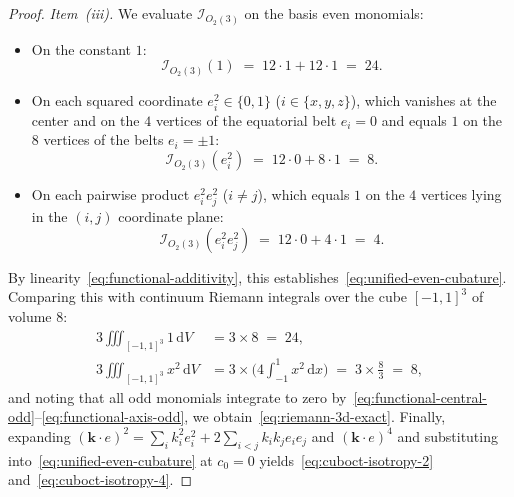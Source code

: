 \documentclass[11pt,a4paper]{article}
\theoremstyle{plain}
\theoremstyle{definition}
\begin{document}
\begin{proof}
\emph{Item~(iii).} We evaluate $\mathcal{I}_{O_2(3)}$ on the basis even monomials:
\begin{itemize}[leftmargin=*]
\item On the constant $1$:
  \begin{equation*}
    \mathcal{I}_{O_2(3)}(1) \;=\; 12\cdot 1 + 12\cdot 1 \;=\; 24.
  \end{equation*}
\item On each squared coordinate $e_i^2 \in \{0, 1\}$ ($i \in \{x, y, z\}$), which vanishes at the center and on the $4$ vertices of the equatorial belt $e_i = 0$ and equals $1$ on the $8$ vertices of the belts $e_i = \pm 1$:
  \begin{equation*}
    \mathcal{I}_{O_2(3)}(e_i^2) \;=\; 12\cdot 0 + 8\cdot 1 \;=\; 8.
  \end{equation*}
\item On each pairwise product $e_i^2 e_j^2$ ($i \ne j$), which equals $1$ on the $4$ vertices lying in the $(i, j)$ coordinate plane:
  \begin{equation*}
    \mathcal{I}_{O_2(3)}(e_i^2 e_j^2) \;=\; 12\cdot 0 + 4\cdot 1 \;=\; 4.
  \end{equation*}
\end{itemize}
By linearity~\eqref{eq:functional-additivity}, this establishes~\eqref{eq:unified-even-cubature}. Comparing this with continuum Riemann integrals over the cube $[-1, 1]^3$ of volume $8$:
\begin{align*}
  3\iiint_{[-1,1]^3} 1\,\mathrm{d}V &= 3 \times 8 \;=\; 24, \\
  3\iiint_{[-1,1]^3} x^2\,\mathrm{d}V &= 3 \times \biggl(4\int_{-1}^{1} x^2\,\mathrm{d}x\biggr) \;=\; 3 \times \frac{8}{3} \;=\; 8,
\end{align*}
and noting that all odd monomials integrate to zero by~\eqref{eq:functional-central-odd}--\eqref{eq:functional-axis-odd}, we obtain~\eqref{eq:riemann-3d-exact}. Finally, expanding $(\mathbf{k}\cdot e)^2 = \sum_i k_i^2 e_i^2 + 2\sum_{i<j} k_i k_j e_i e_j$ and $(\mathbf{k}\cdot e)^4$ and substituting into~\eqref{eq:unified-even-cubature} at $c_0 = 0$ yields~\eqref{eq:cuboct-isotropy-2} and~\eqref{eq:cuboct-isotropy-4}.
\end{proof}
\end{document}
